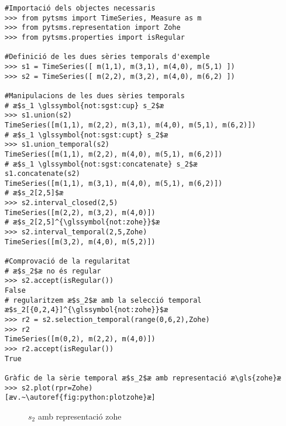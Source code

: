 \begin{lstlisting}[style=py,caption=Exemple d'operacions amb Pytsms,label=lst:pytsms:ex1]
#Importació dels objectes necessaris
>>> from pytsms import TimeSeries, Measure as m
>>> from pytsms.representation import Zohe
>>> from pytsms.properties import isRegular

#Definició de les dues sèries temporals d'exemple
>>> s1 = TimeSeries([ m(1,1), m(3,1), m(4,0), m(5,1) ])
>>> s2 = TimeSeries([ m(2,2), m(3,2), m(4,0), m(6,2) ])

#Manipulacions de les dues sèries temporals
# æ$s_1 \glssymbol{not:sgst:cup} s_2$æ
>>> s1.union(s2)
TimeSeries([m(1,1), m(2,2), m(3,1), m(4,0), m(5,1), m(6,2)])
# æ$s_1 \glssymbol{not:sgst:cupt} s_2$æ
>>> s1.union_temporal(s2)
TimeSeries([m(1,1), m(2,2), m(4,0), m(5,1), m(6,2)])
# æ$s_1 \glssymbol{not:sgst:concatenate} s_2$æ
s1.concatenate(s2) 
TimeSeries([m(1,1), m(3,1), m(4,0), m(5,1), m(6,2)])
# æ$s_2[2,5]$æ
>>> s2.interval_closed(2,5)
TimeSeries([m(2,2), m(3,2), m(4,0)])
# æ$s_2[2,5]^{\glssymbol{not:zohe}}$æ
>>> s2.interval_temporal(2,5,Zohe)
TimeSeries([m(3,2), m(4,0), m(5,2)])

#Comprovació de la regularitat
# æ$s_2$æ no és regular
>>> s2.accept(isRegular())
False
# regularitzem æ$s_2$æ amb la selecció temporal æ$s_2[{0,2,4}]^{\glssymbol{not:zohe}}$æ
>>> r2 = s2.selection_temporal(range(0,6,2),Zohe)
>>> r2
TimeSeries([m(0,2), m(2,2), m(4,0)])
>>> r2.accept(isRegular())
True

Gràfic de la sèrie temporal æ$s_2$æ amb representació æ\gls{zohe}æ
>>> s2.plot(rpr=Zohe)
[æv.~\autoref{fig:python:plotzohe}æ]
\end{lstlisting}




\begin{figure}[tp]
  \centering
   \caption{$s_2$ amb representació \gls{zohe}}
   \label{fig:python:plotzohe}
\end{figure}




